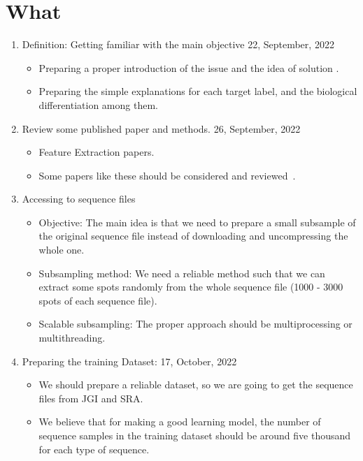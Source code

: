 \documentclass[a4paper]{article}
\newcommand{\deadline}[1]{{\color{blue} \hfill{#1} }}
\begin{document}
    \section{What}\label{sec:what}
    \begin{enumerate}
        \item Definition: Getting familiar with the main objective \deadline{22, September, 2022}
        \begin{itemize}
            \item Preparing a proper introduction of the issue and the idea of solution .
            \item Preparing the simple explanations for each target label, and the biological differentiation among them.
        \end{itemize}
        \item Review some published paper and methods. \deadline{26, September, 2022}
        \begin{itemize}
            \item Feature Extraction papers.
            \item Some papers like these should be considered and reviewed~\cite[]{RF102}.
        \end{itemize}
        \item Accessing to sequence files
        \begin{itemize}
            \item Objective: The main idea is that we need to prepare a small subsample of the original sequence file instead of downloading and uncompressing the whole one.
            \item Subsampling method: We need a reliable method such that we can extract some spots randomly from the whole sequence file (1000 - 3000 spots of each sequence file).
            \item Scalable subsampling: The proper approach should be multiprocessing or multithreading.
        \end{itemize}
        \item Preparing the training Dataset:\deadline{17, October, 2022}
        \begin{itemize}
            \item We should prepare a reliable dataset, so we are going to get the sequence files from JGI and SRA.\@
            \item We believe that for making a good learning model, the number of sequence samples in the training dataset should be around five thousand for each type of sequence.

\end{itemize}
\end{enumerate}
\end{document}
